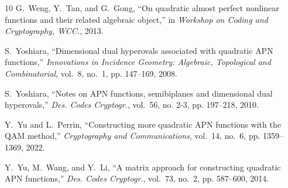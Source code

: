\documentclass{amsart}[11pt]
\theoremstyle{plain}
\theoremstyle{definition}
\numberwithin{theorem}{section}
\numberwithin{equation}{section}
\numberwithin{table}{section}
\numberwithin{figure}{section}
\numberwithin{algorithm}{section}
\begin{document}
\begin{thebibliography}{10}
G.~Weng, Y.~Tan, and G.~Gong, ``On quadratic almost perfect nonlinear functions and their related algebraic object,'' in \emph{Workshop on Coding and Cryptography, WCC.}, 2013.

S.~Yoshiara, ``Dimensional dual hyperovals associated with quadratic {APN} functions,'' \emph{Innovations in Incidence Geometry: Algebraic, Topological and Combinatorial}, vol.~8, no.~1, pp. 147--169, 2008.

S.~Yoshiara, ``Notes on {APN} functions, semibiplanes and dimensional dual hyperovals,'' \emph{Des. Codes Cryptogr.}, vol.~56, no. 2-3, pp. 197--218, 2010.

Y.~Yu and L.~Perrin, ``Constructing more quadratic {APN} functions with the {QAM} method,'' \emph{Cryptography and Communications}, vol.~14, no.~6, pp. 1359--1369, 2022.

Y.~Yu, M.~Wang, and Y.~Li, ``A matrix approach for constructing quadratic {APN} functions,'' \emph{Des. Codes Cryptogr.}, vol.~73, no.~2, pp. 587--600, 2014.

\end{thebibliography}
\end{document}
